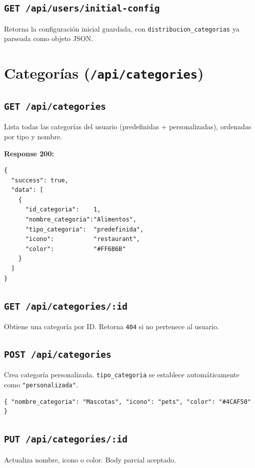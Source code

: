 \subsection{\texttt{GET /api/users/initial-config}}
Retorna la configuración inicial guardada, con \texttt{distribucion\_categorias} ya parseada como objeto JSON.

\section{Categorías (\texttt{/api/categories})}

\subsection{\texttt{GET /api/categories}}
Lista todas las categorías del usuario (predefinidas + personalizadas), ordenadas por tipo y nombre.

\textbf{Response 200:}
\begin{lstlisting}[style=json]
{
  "success": true,
  "data": [
    {
      "id_categoria":    1,
      "nombre_categoria":"Alimentos",
      "tipo_categoria":  "predefinida",
      "icono":           "restaurant",
      "color":           "#FF6B6B"
    }
  ]
}
\end{lstlisting}

\subsection{\texttt{GET /api/categories/:id}} Obtiene una categoría por ID. Retorna \texttt{404} si no pertenece al usuario.

\subsection{\texttt{POST /api/categories}}
Crea categoría personalizada. \texttt{tipo\_categoria} se establece automáticamente como \texttt{"personalizada"}.
\begin{lstlisting}[style=json]
{ "nombre_categoria": "Mascotas", "icono": "pets", "color": "#4CAF50" }
\end{lstlisting}

\subsection{\texttt{PUT /api/categories/:id}} Actualiza nombre, icono o color. Body parcial aceptado.

